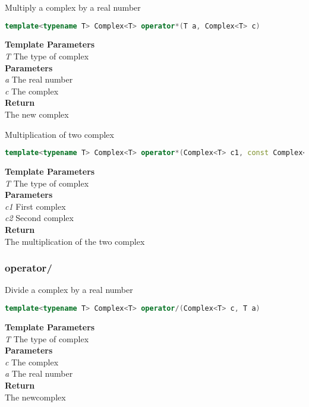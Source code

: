 \begin{mdframed}
Multiply a complex by a real number
\begin{lstlisting}[language=C++]
template<typename T> Complex<T> operator*(T a, Complex<T> c) 
\end{lstlisting}
\textbf{Template Parameters} \\ 
\textit{T} The type of complex \\ 
\textbf{Parameters} \\ 
\textit{a} The real number \\ 
\textit{c} The complex \\ 
\textbf{Return} \\ 
The new complex\\ 
\end{mdframed}

\begin{mdframed}
Multiplication of two complex
\begin{lstlisting}[language=C++]
template<typename T> Complex<T> operator*(Complex<T> c1, const Complex<T>& c2) 
\end{lstlisting}
\textbf{Template Parameters} \\ 
\textit{T} The type of complex \\ 
\textbf{Parameters} \\ 
\textit{c1} First complex \\ 
\textit{c2} Second complex \\ 
\textbf{Return} \\ 
The multiplication of the two complex\\ 
\end{mdframed}

\subsubsection{operator/}
\begin{mdframed}
Divide a complex by a real number
\begin{lstlisting}[language=C++]
template<typename T> Complex<T> operator/(Complex<T> c, T a) 
\end{lstlisting}
\textbf{Template Parameters} \\ 
\textit{T} The type of complex \\ 
\textbf{Parameters} \\ 
\textit{c} The complex \\ 
\textit{a} The real number \\ 
\textbf{Return} \\ 
The newcomplex\\ 
\end{mdframed}

